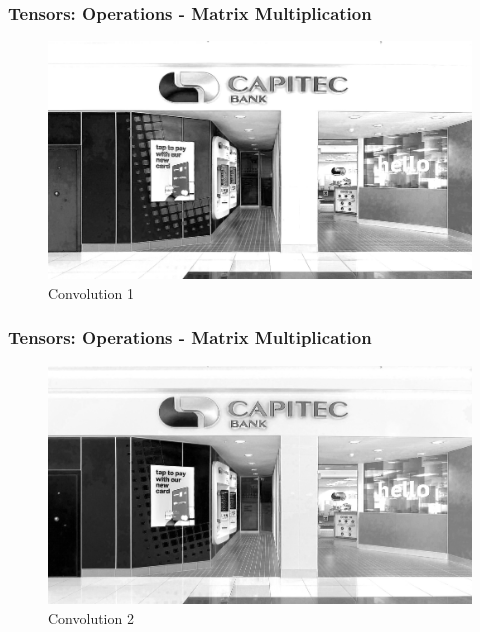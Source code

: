 \documentclass[11pt]{beamer}
\begin{document}
\begin{frame}
	\frametitle{Tensors: Operations - Matrix Multiplication}
	\begin{figure}
		\includegraphics[scale=0.17]{"conv_1"}
		\caption{Convolution 1}
	\end{figure}
\end{frame}

\begin{frame}
	\frametitle{Tensors: Operations - Matrix Multiplication}
	\begin{figure}
		\includegraphics[scale=0.17]{"conv_2"}
		\caption{Convolution 2}
	\end{figure}
\end{frame}
\end{document}
